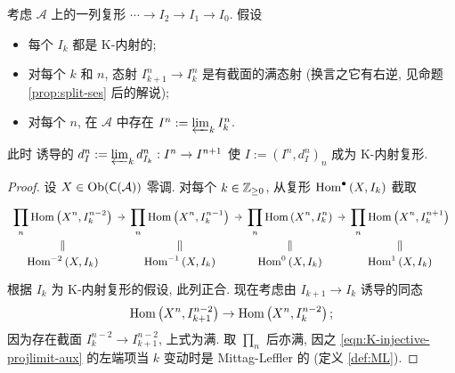 \begin{lemma}\label{prop:K-injective-projlimit-aux}
	考虑 $\mathcal{A}$ 上的一列复形 $\cdots \to I_2 \to I_1 \to I_0$. 假设
	\begin{itemize}
		\item 每个 $I_k$ 都是 K-内射的;
		\item 对每个 $k$ 和 $n$, 态射 $I_{k+1}^n \to I_k^n$ 是有截面的满态射 (换言之它有右逆, 见命题 \ref{prop:split-ses} 后的解说);
		\item 对每个 $n$, 在 $\mathcal{A}$ 中存在 $I^n := \varprojlim_k I_k^n$.
	\end{itemize}
	此时 诱导的 $d^n_I := \varprojlim_k d_{I_k}^n : I^n \to I^{n+1}$ 使 $I := (I^n, d_I^n)_n$ 成为 K-内射复形.
\end{lemma}
\begin{proof}
	设 $X \in \operatorname{Ob}(\mathsf{C}(\mathcal{A}))$ 零调. 对每个 $k \in \mathbb{Z}_{\geq 0}$, 从复形 $\operatorname{Hom}^\bullet\left( X, I_k \right)$ 截取
	\begin{equation}\label{eqn:K-injective-projlimit-aux}\begin{tikzcd}
		[row sep=small, column sep=tiny, every cell/.append style = {font = \small}]
		\displaystyle\prod_n \Hom\left( X^n, I_k^{n-2} \right) \arrow[r] & \displaystyle\prod_n \Hom\left( X^n, I_k^{n-1} \right) \arrow[r] & \displaystyle\prod_n \Hom\left( X^n, I_k^n \right) \arrow[r] & \displaystyle\prod_n \Hom\left( X^n, I_k^{n+1} \right) \\
		\Hom^{-2}\left( X, I_k \right) \arrow[equal, u] & \Hom^{-1}\left( X, I_k \right) \arrow[equal, u] & \Hom^0\left( X, I_k \right) \arrow[equal, u] & \Hom^1\left( X, I_k \right) \arrow[equal, u]
	\end{tikzcd}\end{equation}
	根据 $I_k$ 为 K-内射复形的假设, 此列正合. 现在考虑由 $I_{k+1} \to I_k$ 诱导的同态
	\[ \operatorname{Hom}\left( X^n, I_{k+1}^{n-2} \right) \to \operatorname{Hom}\left( X^n, I_k^{n-2} \right); \]
	因为存在截面 $I_k^{n-2} \to I_{k+1}^{n-2}$, 上式为满. 取 $\prod_n$ 后亦满, 因之 \eqref{eqn:K-injective-projlimit-aux} 的左端项当 $k$ 变动时是 Mittag-Leffler 的 (定义 \ref{def:ML}).
	

\end{proof}
